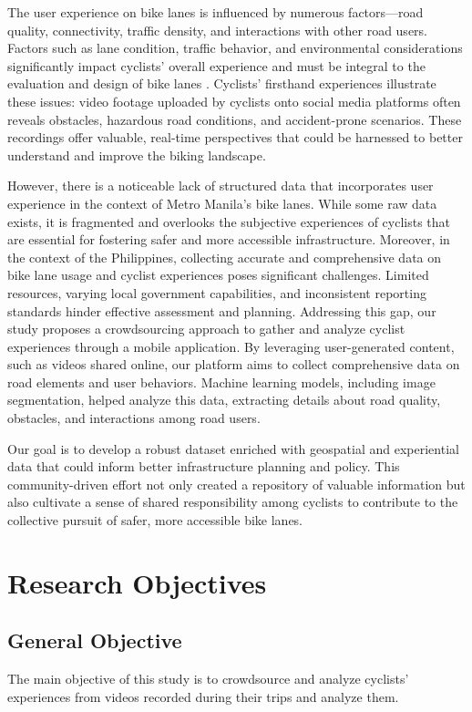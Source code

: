 The user experience on bike lanes is influenced by numerous factors—road quality, connectivity, traffic density, and interactions with other road users. Factors such as lane condition, traffic behavior, and environmental considerations significantly impact cyclists' overall experience and must be integral to the evaluation and design of bike lanes \citep{Ketikidis:2023}. Cyclists' firsthand experiences illustrate these issues: video footage uploaded by cyclists onto social media platforms often reveals obstacles, hazardous road conditions, and accident-prone scenarios. These recordings offer valuable, real-time perspectives that could be harnessed to better understand and improve the biking landscape.

However, there is a noticeable lack of structured data that incorporates user experience in the context of Metro Manila's bike lanes. While some raw data exists, it is fragmented and overlooks the subjective experiences of cyclists that are essential for fostering safer and more accessible infrastructure. Moreover, in the context of the Philippines, collecting accurate and comprehensive data on bike lane usage and cyclist experiences poses significant challenges. Limited resources, varying local government capabilities, and inconsistent reporting standards hinder effective assessment and planning. Addressing this gap, our study proposes a crowdsourcing approach to gather and analyze cyclist experiences through a mobile application. By leveraging user-generated content, such as videos shared online, our platform aims to collect comprehensive data on road elements and user behaviors. Machine learning models, including image segmentation, helped analyze this data, extracting details about road quality, obstacles, and interactions among road users. 

Our goal is to develop a robust dataset enriched with geospatial and experiential data that could inform better infrastructure planning and policy. This community-driven effort not only created a repository of valuable information but also cultivate a sense of shared responsibility among cyclists to contribute to the collective pursuit of safer, more accessible bike lanes.

\section{Research Objectives}
\label{sec:researchobjectives}


\subsection{General Objective}
\label{sec:generalobjective}
The main objective of this study is to crowdsource and analyze cyclists' experiences from videos recorded during their trips and analyze them.



